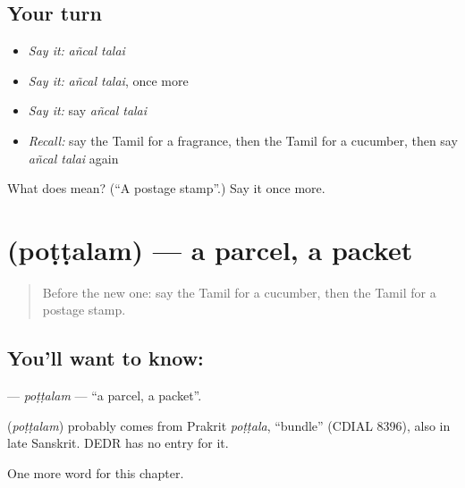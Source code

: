 \subsection*{Your turn}
\begin{itemize}
\raggedright
  \item \emph{Say it:} \emph{añcal talai}
  \item \emph{Say it:} \emph{añcal talai}, once more
  \item \emph{Say it:} say \emph{añcal talai}
  \item \emph{Recall:} say the Tamil for a fragrance, then the Tamil for a cucumber, then say \emph{añcal talai} again
\end{itemize}

\begin{tcolorbox}[breakable,colback=teal!4,colframe=teal!35!black,title={Before you move on}]
What does   mean? (\textquotedblleft{}A postage stamp\textquotedblright{}.) Say it once more.
\end{tcolorbox}
\section[\texorpdfstring{\ta{பொட்டலம்} (poṭṭalam)}{பொட்டலம் (poṭṭalam)}]{ (poṭṭalam) — a parcel, a packet}

\label{lesson:TA-C244-pottalam}



\begin{quote}
Before the new one: say the Tamil for a cucumber, then the Tamil for a postage stamp.
\end{quote}

\subsection*{You'll want to know: }
\textbf{} — \emph{poṭṭalam} — \textquotedblleft{}a parcel, a packet\textquotedblright{}.

\begin{cousinweb}
\textbf{} (\emph{poṭṭalam}) probably comes from Prakrit \emph{poṭṭala}, \textquotedblleft{}bundle\textquotedblright{} (CDIAL 8396), also in late Sanskrit. DEDR has no entry for it.
\end{cousinweb}

\begin{grammarlens}[title={What you've built}]
One more word for this chapter.
\end{grammarlens}

